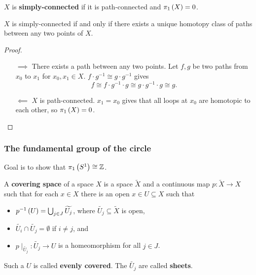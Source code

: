 \begin{definition*}
$ X $ is \textbf{simply-connected} if it is path-connected and $ \pi_1\left( X \right) = 0 $.
\end{definition*}

\begin{proposition}
\label{prop:1.6}
$ X $ is simply-connected if and only if there exists a unique homotopy class of paths between any two points of $ X $.
\end{proposition}

\begin{proof}
\hfill
\begin{itemize}
\item[$ \implies $] There exists a path between any two points. Let $ f, g $ be two paths from $ x_0 $ to $ x_1 $ for $ x_0, x_1 \in X $. $ f \cdot g^{-1} \cong g \cdot g^{-1} $ gives
$$ f \cong f \cdot g^{-1} \cdot g \cong g \cdot g^{-1} \cdot g \cong g. $$
\item[$ \impliedby $] $ X $ is path-connected. $ x_1 = x_0 $ gives that all loops at $ x_0 $ are homotopic to each other, so $ \pi_1\left( X \right) = 0 $.
\end{itemize}
\end{proof}

\pagebreak

\subsubsection{The fundamental group of the circle}

Goal is to show that $ \pi_1\left( S^1 \right) \cong \mathbb{Z} $.


\begin{definition*}
A \textbf{covering space} of a space $ X $ is a space $ \widetilde{X} $ and a continuous map $ p : \widetilde{X} \to X $ such that for each $ x \in X $ there is an open $ x \in U \subseteq X $ such that
\begin{itemize}
\item $ p^{-1}\left( U \right) = \bigcup_{j \in J} \widetilde{U_j} $, where $ \widetilde{U_j} \subseteq \widetilde{X} $ is open,
\item $ \widetilde{U_i} \cap \widetilde{U_j} = \emptyset $ if $ i \ne j $, and
\item $ p \mid_{\widetilde{U_j}} : \widetilde{U_j} \to U $ is a homeomorphism for all $ j \in J $.
\end{itemize}
Such a $ U $ is called \textbf{evenly covered}. The $ \widetilde{U_j} $ are called \textbf{sheets}.
\end{definition*}

